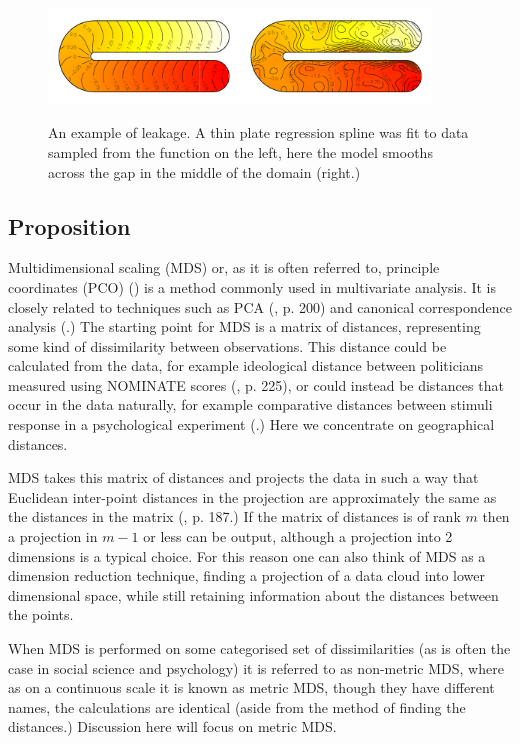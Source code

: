 \documentclass[a4paper,10pt]{article}
\begin{document}
\begin{figure}
\centering
\includegraphics[width=4in]{figs/ramsay-leak.pdf}\\
\caption{An example of leakage. A thin plate regression spline was fit to data sampled from the function on the left, here the model smooths across the gap in the middle of the domain (right.)}
\label{leakage}
\end{figure}


\subsection{Proposition}

Multidimensional scaling (MDS) or, as it is often referred to, principle coordinates (PCO) (\cite{gower1966}) is a method commonly used in multivariate analysis. It is closely related to techniques such as PCA (\cite{chatfieldcollins}, p. 200) and canonical correspondence analysis (\cite{terbraak}.) The starting point for MDS is a matrix of distances, representing some kind of dissimilarity between observations. This distance could be calculated from the data, for example ideological distance between politicians measured using NOMINATE scores (\cite{quantss}, p. 225), or could instead be distances that occur in the data naturally,  for example comparative distances between stimuli response in a psychological experiment (\cite{torgerson}.) Here we concentrate on geographical distances.

MDS takes this matrix of distances and projects the data in such a way that Euclidean inter-point distances in the projection are approximately the same as the distances in the matrix (\cite{chatfieldcollins}, p. 187.) If the matrix of distances is of rank $m$ then a projection in $m-1$ or less can be output, although a projection into 2 dimensions is a typical choice. For this reason one can also think of MDS as a dimension reduction technique, finding a projection of a data cloud into lower dimensional space, while still retaining information about the distances between the points.

When MDS is performed on some categorised set of dissimilarities (as is often the case in social science and psychology) it is referred to as non-metric MDS, where as on a continuous scale it is known as metric MDS, though they have different names, the calculations are identical (aside from the method of finding the distances.) Discussion here will focus on metric MDS.
\end{document}
